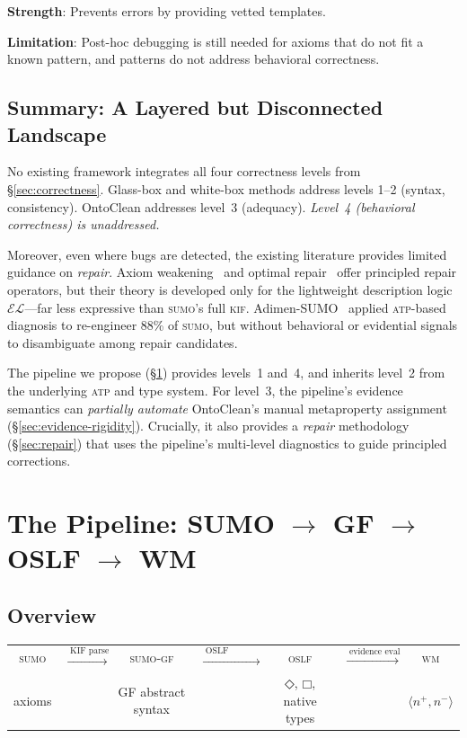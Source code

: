 \documentclass[11pt]{article}
\newcommand{\DiamondOp}{\mathbin{\Diamond}}
\newcommand{\BoxOp}{\mathbin{\Box}}
\newcommand{\KIF}{\textsc{kif}}
\newcommand{\SUMO}{\textsc{sumo}}
\newcommand{\GF}{\textsc{gf}}
\newcommand{\OSLF}{\textsc{oslf}}
\newcommand{\WM}{\textsc{wm}}
\newcommand{\ATP}{\textsc{atp}}
\newcommand{\ev}[2]{\langle #1, #2 \rangle}
\theoremstyle{definition}
\theoremstyle{plain}
\begin{document}
\textbf{Strength}: Prevents errors by providing vetted templates.

\textbf{Limitation}: Post-hoc debugging is still needed for axioms
that do not fit a known pattern, and patterns do not address
behavioral correctness.

\subsection{Summary: A Layered but Disconnected Landscape}

No existing framework integrates all four correctness levels from
\S\ref{sec:correctness}.
Glass-box and white-box methods address levels 1--2 (syntax,
consistency).
OntoClean addresses level~3 (adequacy).
\emph{Level~4 (behavioral correctness) is unaddressed.}

Moreover, even where bugs are detected, the existing literature provides
limited guidance on \emph{repair}.  Axiom weakening~\cite{troquard2018weakening}
and optimal repair~\cite{baader2023pseudocontraction} offer principled repair
operators, but their theory is developed only for the lightweight description
logic $\mathcal{EL}$---far less expressive than \SUMO{}'s full \KIF{}.
Adimen-SUMO~\cite{alvez2012adimensumo} applied \ATP{}-based diagnosis to
re-engineer 88\% of \SUMO{}, but without behavioral or evidential signals
to disambiguate among repair candidates.

The pipeline we propose (\S\ref{sec:pipeline}) provides levels~1
and~4, and inherits level~2 from the underlying \ATP{} and type
system.  For level~3, the pipeline's evidence semantics can
\emph{partially automate} OntoClean's manual metaproperty
assignment (\S\ref{sec:evidence-rigidity}).
Crucially, it also provides a \emph{repair} methodology
(\S\ref{sec:repair}) that uses the pipeline's multi-level diagnostics
to guide principled corrections.

\section{The Pipeline: SUMO $\to$ GF $\to$ OSLF $\to$ WM}
\label{sec:pipeline}

\subsection{Overview}

\begin{center}
\begin{tabular}{@{}ccccccc@{}}
\SUMO{} & $\xrightarrow{\;\text{KIF parse}\;}$ &
\SUMO{}-\GF{} & $\xrightarrow{\;\text{OSLF synthesis}\;}$ &
\OSLF{} & $\xrightarrow{\;\text{evidence eval}\;}$ &
\WM{} \\[2pt]
\small axioms & &
\small GF abstract syntax & &
\small $\DiamondOp$, $\BoxOp$, native types & &
\small $\ev{n^+}{n^-}$ \\
\end{tabular}
\end{center}
\end{document}
